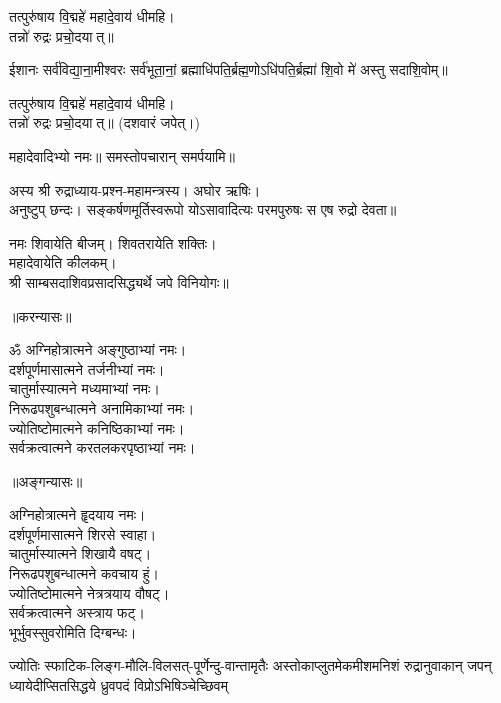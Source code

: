 तत्पुरु॑षाय वि॒द्महे॑ महादे॒वाय॑ धीमहि।\\
तन्नो॑ रुद्रः प्रचो॒दयात्॥

ईशानः सर्व॑विद्या॒ना॒मीश्वरः सर्व॑भूता॒नां॒ ब्रह्माधि॑पति॒र्ब्रह्म॒णो\-ऽधि॑पति॒र्ब्रह्मा॑ शि॒वो मे॑ अस्तु सदाशि॒वोम्॥

तत्पुरु॑षाय वि॒द्महे॑ महादे॒वाय॑ धीमहि।\\
तन्नो॑ रुद्रः प्रचो॒दयात्॥ (दशवारं जपेत्।)

महादेवादिभ्यो नमः॥ समस्तोपचारान् समर्पयामि॥

{\small \closesection}


{\small \closesection}


अस्य श्री रुद्राध्याय-प्रश्न-महामन्त्रस्य। अघोर ऋषिः।\\
अनुष्टुप् छन्दः। सङ्कर्षणमूर्तिस्वरूपो योऽसावादित्यः परमपुरुषः स एष रुद्रो देवता॥

नमः शिवायेति बीजम्। शिवतरायेति शक्तिः।\\
महादेवायेति कीलकम्।\\
श्री साम्बसदाशिवप्रसादसिद्ध्यर्थे जपे विनियोगः॥\\


\centerline{॥करन्यासः॥}
ॐ अग्निहोत्रात्मने अङ्गुष्ठाभ्यां नमः।\\
दर्शपूर्णमासात्मने तर्जनीभ्यां नमः।\\
चातुर्मास्यात्मने मध्यमाभ्यां नमः।\\
निरूढपशुबन्धात्मने अनामिकाभ्यां नमः।\\
ज्योतिष्टोमात्मने कनिष्ठिकाभ्यां नमः।\\
सर्वक्रत्वात्मने करतलकरपृष्ठाभ्यां  नमः।\\


\centerline{॥अङ्गन्यासः॥}
अग्निहोत्रात्मने हॄदयाय नमः।\\
दर्शपूर्णमासात्मने शिरसे स्वाहा।\\
चातुर्मास्यात्मने शिखायै वषट्।\\
निरूढपशुबन्धात्मने कवचाय हुं।\\
ज्योतिष्टोमात्मने नेत्रत्रयाय वौषट्।\\
सर्वक्रत्वात्मने अस्त्राय फट्।\\
भूर्भुवस्सुवरोमिति दिग्बन्धः।\\


{ज्योतिः स्फाटिक-लिङ्ग-मौलि-विलसत्-पूर्णेन्दु-वान्तामृतैः}
{अस्तोकाप्लुतमेकमीशमनिशं रुद्रानुवाकान् जपन्}
{ध्यायेदीप्सितसिद्धये ध्रुवपदं विप्रोऽभिषिञ्चेच्छिवम्}

